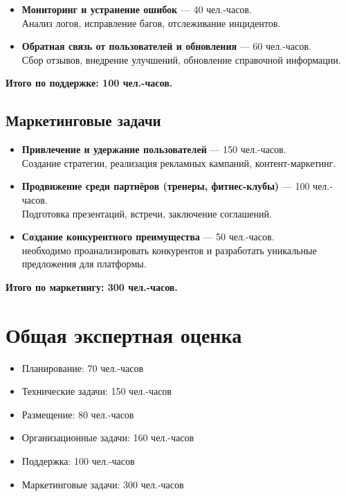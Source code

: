 \documentclass[14pt, russian]{matmex-diploma-custom}
\begin{document}
\begin{itemize}
    \item \textbf{Мониторинг и устранение ошибок} — 40 чел.-часов.\\
    Анализ логов, исправление багов, отслеживание инцидентов.

    \item \textbf{Обратная связь от пользователей и обновления} — 60 чел.-часов.\\
    Сбор отзывов, внедрение улучшений, обновление справочной информации.
\end{itemize}

\textbf{Итого по поддержке: 100 чел.-часов.}

\subsection{Маркетинговые задачи}

\begin{itemize}
    \item \textbf{Привлечение и удержание пользователей} — 150 чел.-часов.\\
    Создание стратегии, реализация рекламных кампаний, контент-маркетинг.

    \item \textbf{Продвижение среди партнёров (тренеры, фитнес-клубы)} — 100 чел.-часов.\\
    Подготовка презентаций, встречи, заключение соглашений.

    \item \textbf{Создание конкурентного преимущества} — 50 чел.-часов. \\
    необходимо проанализировать конкурентов и разработать уникальные предложения для платформы.
\end{itemize}

\textbf{Итого по маркетингу: 300 чел.-часов.}


\section*{Общая экспертная оценка}

\begin{itemize}
    \item Планирование: 70 чел.-часов
    \item Технические задачи: 150 чел.-часов
    \item Размещение: 80 чел.-часов
    \item Организационные задачи: 160 чел.-часов
    \item Поддержка: 100 чел.-часов
    \item Маркетинговые задачи: 300 чел.-часов
\end{itemize}
\end{document}
